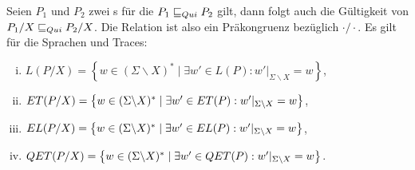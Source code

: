 \begin{Satz}
  \label{StilleHidingSatz}
  Seien $P_1$ und $P_2$ zwei \MEIO{}s für die $P_1 \sqsubseteq  _{Qui} P_2$ gilt, dann folgt
  auch die Gültigkeit von $P_1/X \sqsubseteq  _{Qui} P_2/X$. Die Relation \QRel{} ist also ein
  Präkongruenz bezüglich $\cdot /\cdot$. Es gilt für die Sprachen und Traces:
  \begin{enumerate}[(i)]
    \item $L(P/X) = \left\{w\in (\Sigma\backslash X)^*\mid \exists w'\in L(P):
      w'|_{\Sigma\backslash X} = w\right\}$,
    \item $ET (P/X) = \left\{w\in (\Sigma\backslash X)^*\mid \exists w'\in
      ET(P): w'|_{\Sigma\backslash X} = w\right\}$,
    \item $EL (P/X) = \left\{w\in (\Sigma\backslash X)^*\mid \exists w'\in
      EL(P): w'|_{\Sigma\backslash X} = w\right\}$,
    \item $QET (P/X) = \left\{w\in (\Sigma\backslash X)^*\mid \exists w'\in
      QET(P): w'|_{\Sigma\backslash X} = w\right\}$.
  \end{enumerate}
\end{Satz}
